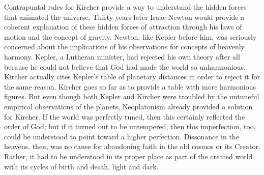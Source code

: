Contrapuntal rules for Kircher provide a way to understand the hidden forces
that animated the universe.%
    \Autocites{Gouk:Harmonics}
Thirty years later Isaac Newton would provide a coherent explanation of these
hidden forces of attraction through his laws of motion and the concept of
gravity.
Newton, like Kepler before him, was seriously concerned about the implications
of his observations for concepts of heavenly harmony.
Kepler, a Lutheran minister, had rejected his own theory after all because he
could not believe that God had made the world so unharmonious.%
    \citXXX[Hawking?]
Kircher actually cites Kepler's table of planetary distances in order to
reject it for the same reason.%
    \Autocite[\XXX]{Kircher:Musurgia}
Kircher goes so far as to provide a  table with more
harmonious figures.
But even though both Kepler and Kircher were troubled by the untuneful empirical
observations of the planets, Neoplatonism already provided a solution for
Kircher. 
If the world was perfectly tuned, then this certainly reflected the order of
God; but if it turned out to be untempered, then this imperfection, too, could
be understood to point toward a higher perfection.  Dissonance in the heavens,
then, was no cause for abandoning faith in the old cosmos or its Creator.
Rather, it had to be understood in its proper place as part of the created world
with its cycles of birth and death, light and dark.

